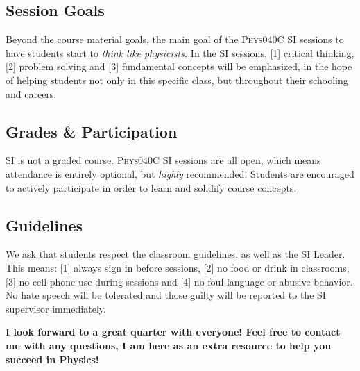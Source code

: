 \documentclass[11pt]{article}
\begin{document}
\subsection*{Session Goals}

Beyond the course material goals, the main goal of the \textsc{Phys040C} SI sessions to have students start to \emph{think like physicists.} In the SI sessions, [1] critical thinking, [2] problem solving and [3] fundamental concepts will be emphasized, in the hope of helping students not only in this specific class, but throughout their schooling and careers. 

\subsection*{Grades \& Participation}

SI is not a graded course. 
\textsc{Phys040C SI} sessions are all open, which means  attendance is entirely optional, but \emph{highly} recommended!
Students are encouraged to actively participate in order to learn and solidify course concepts.  


\subsection*{Guidelines}

We ask that students respect the classroom guidelines, as well as the SI Leader. 
This means: [1] always sign in before sessions, [2] no food or drink in classrooms, [3] no cell phone use during sessions and [4] no foul language or abusive behavior.
No hate speech will be tolerated and those guilty will be reported to the SI supervisor immediately. 

\begin{center}
	
{\bfseries I look forward to a great quarter with everyone! Feel free to contact me with any questions, I am here as an extra resource to help you succeed in Physics!}

\end{center}
\end{document}
